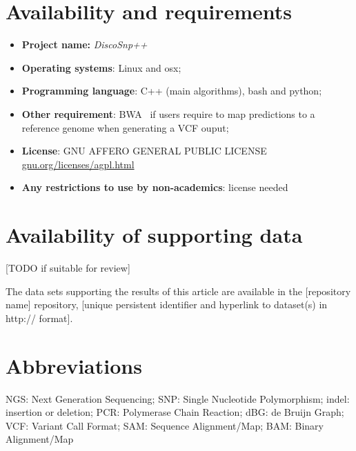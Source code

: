 \documentclass{bmcart}
\newcommand{\discopp}{{\it DiscoSnp++}\xspace}
\begin{document}

\section*{Availability and requirements}
\begin{itemize}
	\item \textbf{Project name:} \discopp
	\item \textbf{Operating systems}: Linux and osx;
	\item \textbf{Programming language}: C++ (main algorithms), bash and python;
	\item \textbf{Other requirement}: BWA~\cite{bwa} if users require to map predictions to a reference genome when generating a VCF ouput;
	\item \textbf{License}: GNU AFFERO GENERAL PUBLIC LICENSE \url{gnu.org/licenses/agpl.html}
	\item \textbf{Any restrictions to use by non-academics}: license needed
\end{itemize}


\section*{Availability of supporting data}
[TODO if suitable for review]

The data sets supporting the results of this article are available in the [repository name] repository, [unique persistent identifier and hyperlink to dataset(s) in http:// format].


\section*{Abbreviations}
NGS: Next Generation Sequencing; SNP: Single Nucleotide Polymorphism; indel: insertion or deletion; PCR: Polymerase Chain Reaction; dBG: de Bruijn Graph; VCF: Variant Call Format; SAM: Sequence Alignment/Map; BAM: Binary Alignment/Map



\end{document}
